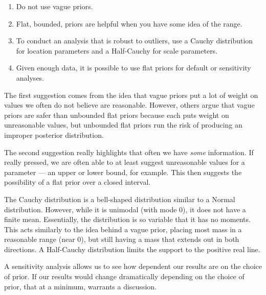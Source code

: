 \documentclass[
  letterpaper,
  DIV=11,
  numbers=noendperiod]{scrreprt}
\providecommand{\tightlist}{%
  \setlength{\itemsep}{0pt}\setlength{\parskip}{0pt}}\usepackage{longtable,booktabs,array}
\theoremstyle{definition}
\theoremstyle{definition}
\theoremstyle{plain}
\theoremstyle{remark}
\begin{document}
\begin{enumerate}
\def\labelenumi{\arabic{enumi}.}
\tightlist
\item
  Do not use vague priors.
\item
  Flat, bounded, priors are helpful when you have some idea of the
  range.
\item
  To conduct an analysis that is robust to outliers, use a Cauchy
  distribution for location parameters and a Half-Cauchy for scale
  parameters.
\item
  Given enough data, it is possible to use flat priors for default or
  sensitivity analyses.
\end{enumerate}

The first suggestion comes from the idea that vague priors put a lot of
weight on values we often do not believe are reasonable. However, others
argue that vague priors are safer than unbounded flat priors because
each puts weight on unreasonable values, but unbounded flat priors run
the risk of producing an improper posterior distribution.

The second suggestion really highlights that often we have \emph{some}
information. If really pressed, we are often able to at least suggest
unreasonable values for a parameter --- an upper or lower bound, for
example. This then suggests the possibility of a flat prior over a
closed interval.

The Cauchy distribution is a bell-shaped distribution similar to a
Normal distribution. However, while it is unimodal (with mode 0), it
does not have a finite mean. Essentially, the distribution is so
variable that it has no moments. This acts similarly to the idea behind
a vague prior, placing most mass in a reasonable range (near 0), but
still having a mass that extends out in both directions. A Half-Cauchy
distribution limits the support to the positive real line.

A sensitivity analysis allows us to see how dependent our results are on
the choice of prior. If our results would change dramatically depending
on the choice of prior, that at a minimum, warrants a discussion.
\end{document}
